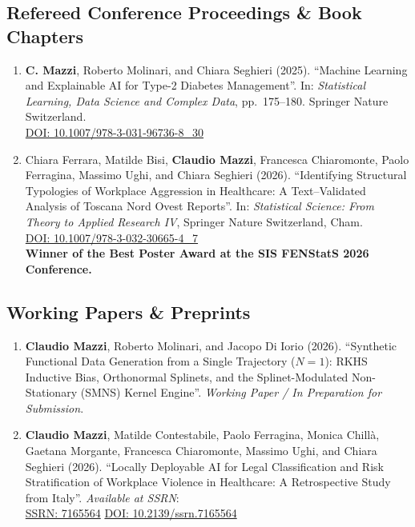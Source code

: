 \documentclass[10pt,a4paper]{article}
\newcommand{\myname}{\textbf{Claudio Mazzi}}
\newcommand{\mynameabbr}{\textbf{C. Mazzi}}
\begin{document}
\subsection{Refereed Conference Proceedings \& Book Chapters}
\begin{enumerate}[resume]
    \item \mynameabbr, Roberto Molinari, and Chiara Seghieri (2025). 
    ``Machine Learning and Explainable AI for Type-2 Diabetes Management''. 
    In: \textit{Statistical Learning, Data Science and Complex Data}, pp.~175--180. Springer Nature Switzerland. \\
    \href{https://doi.org/10.1007/978-3-031-96736-8_30}{\small\color{secondary}\faExternalLink* DOI: 10.1007/978-3-031-96736-8\_30}

    \item Chiara Ferrara, Matilde Bisi, \myname, Francesca Chiaromonte, Paolo Ferragina, Massimo Ughi, and Chiara Seghieri (2026). 
    ``Identifying Structural Typologies of Workplace Aggression in Healthcare: A Text--Validated Analysis of Toscana Nord Ovest Reports''. 
    In: \textit{Statistical Science: From Theory to Applied Research IV}, Springer Nature Switzerland, Cham. \\
    \href{https://doi.org/10.1007/978-3-032-30665-4_7}{\small\color{secondary}\faExternalLink* DOI: 10.1007/978-3-032-30665-4\_7} \\
    \textcolor{awardgold}{\small\faTrophy\; \textbf{Winner of the Best Poster Award at the SIS FENStatS 2026 Conference.}}
\end{enumerate}

\subsection{Working Papers \& Preprints}
\begin{enumerate}[resume]
    \item \myname, Roberto Molinari, and Jacopo Di Iorio (2026). 
    ``Synthetic Functional Data Generation from a Single Trajectory ($N = 1$): RKHS Inductive Bias, Orthonormal Splinets, and the Splinet-Modulated Non-Stationary (SMNS) Kernel Engine''. 
    \textit{Working Paper / In Preparation for Submission}.
    
    \item \myname, Matilde Contestabile, Paolo Ferragina, Monica Chill\`a, Gaetana Morgante, Francesca Chiaromonte, Massimo Ughi, and Chiara Seghieri (2026). 
    ``Locally Deployable AI for Legal Classification and Risk Stratification of Workplace Violence in Healthcare: A Retrospective Study from Italy''. 
    \textit{Available at SSRN}: \\
    \href{https://ssrn.com/abstract=7165564}{\small\color{secondary}\faExternalLink* SSRN: 7165564} \;\textbar\; 
    \href{https://doi.org/10.2139/ssrn.7165564}{\small\color{secondary}DOI: 10.2139/ssrn.7165564}
\end{enumerate}
\end{document}

